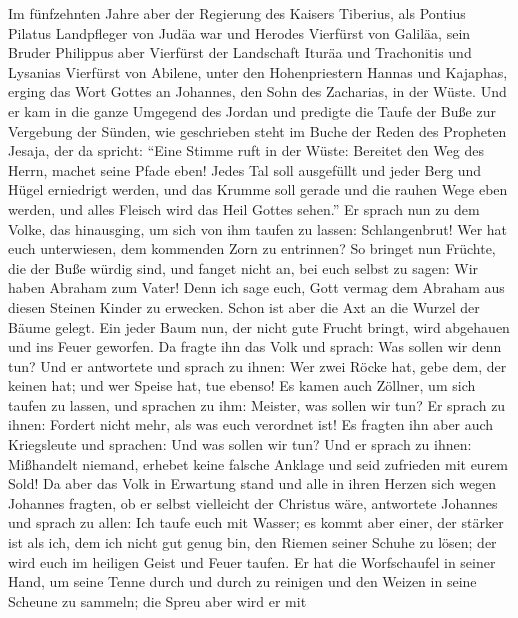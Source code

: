  Im fünfzehnten Jahre aber der Regierung des Kaisers
Tiberius, als Pontius Pilatus Landpfleger von Judäa war und Herodes
Vierfürst von Galiläa, sein Bruder Philippus aber Vierfürst der
Landschaft Ituräa und Trachonitis und Lysanias Vierfürst von Abilene,
 unter den Hohenpriestern Hannas und Kajaphas, erging das
Wort Gottes an Johannes, den Sohn des Zacharias, in der Wüste.
 Und er kam in die ganze Umgegend des Jordan und predigte
die Taufe der Buße zur Vergebung der Sünden,  wie
geschrieben steht im Buche der Reden des Propheten Jesaja, der da
spricht: ``Eine Stimme ruft in der Wüste: Bereitet den Weg des Herrn,
machet seine Pfade eben!  Jedes Tal soll ausgefüllt und
jeder Berg und Hügel erniedrigt werden, und das Krumme soll gerade und
die rauhen Wege eben werden,  und alles Fleisch wird das
Heil Gottes sehen.''  Er sprach nun zu dem Volke, das
hinausging, um sich von ihm taufen zu lassen: Schlangenbrut! Wer hat
euch unterwiesen, dem kommenden Zorn zu entrinnen?  So
bringet nun Früchte, die der Buße würdig sind, und fanget nicht an, bei
euch selbst zu sagen: Wir haben Abraham zum Vater! Denn ich sage euch,
Gott vermag dem Abraham aus diesen Steinen Kinder zu erwecken.
 Schon ist aber die Axt an die Wurzel der Bäume gelegt.
Ein jeder Baum nun, der nicht gute Frucht bringt, wird abgehauen und ins
Feuer geworfen.  Da fragte ihn das Volk und sprach: Was
sollen wir denn tun?  Und er antwortete und sprach zu
ihnen: Wer zwei Röcke hat, gebe dem, der keinen hat; und wer Speise hat,
tue ebenso!  Es kamen auch Zöllner, um sich taufen zu
lassen, und sprachen zu ihm: Meister, was sollen wir tun?
 Er sprach zu ihnen: Fordert nicht mehr, als was euch
verordnet ist!  Es fragten ihn aber auch Kriegsleute und
sprachen: Und was sollen wir tun? Und er sprach zu ihnen: Mißhandelt
niemand, erhebet keine falsche Anklage und seid zufrieden mit eurem
Sold!  Da aber das Volk in Erwartung stand und alle in
ihren Herzen sich wegen Johannes fragten, ob er selbst vielleicht der
Christus wäre,  antwortete Johannes und sprach zu allen:
Ich taufe euch mit Wasser; es kommt aber einer, der stärker ist als ich,
dem ich nicht gut genug bin, den Riemen seiner Schuhe zu lösen; der wird
euch im heiligen Geist und Feuer taufen.  Er hat die
Worfschaufel in seiner Hand, um seine Tenne durch und durch zu reinigen
und den Weizen in seine Scheune zu sammeln; die Spreu aber wird er mit
